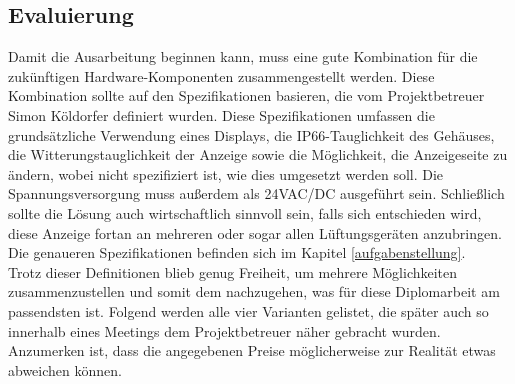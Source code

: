 \subsection{Evaluierung}
Damit die Ausarbeitung beginnen kann, muss eine gute Kombination für die zukünftigen Hardware-Komponenten zusammengestellt werden. Diese Kombination sollte auf den Spezifikationen basieren, die vom Projektbetreuer Simon Köldorfer definiert wurden. Diese Spezifikationen umfassen die grundsätzliche Verwendung eines Displays, die IP66-Tauglichkeit des Gehäuses, die Witterungstauglichkeit der Anzeige sowie die Möglichkeit, die Anzeigeseite zu ändern, wobei nicht spezifiziert ist, wie dies umgesetzt werden soll. Die Spannungsversorgung muss außerdem als 24VAC/DC ausgeführt sein. Schließlich sollte die Lösung auch wirtschaftlich sinnvoll sein, falls sich entschieden wird, diese Anzeige fortan an mehreren oder sogar allen Lüftungsgeräten anzubringen. Die genaueren Spezifikationen befinden sich im Kapitel \ref{aufgabenstellung}.\\
Trotz dieser Definitionen blieb genug Freiheit, um mehrere Möglichkeiten zusammenzustellen und somit dem nachzugehen, was für diese Diplomarbeit am passendsten ist. 
Folgend werden alle vier Varianten gelistet, die später auch so innerhalb eines Meetings dem Projektbetreuer näher gebracht wurden. Anzumerken ist, dass die angegebenen Preise möglicherweise zur Realität etwas abweichen können.
